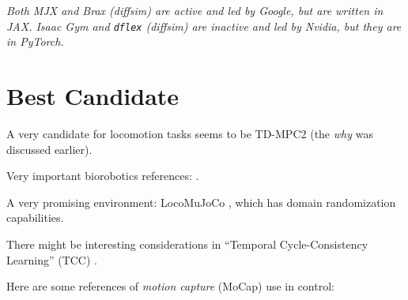 \documentclass[12pt,a4paper]{article}
\begin{document}
\emph{Both MJX and Brax (diffsim) are active and led by Google, but are written in JAX.
Isaac Gym and \texttt{dflex} (diffsim) are inactive and led by Nvidia, but they are in PyTorch.}

\section{Best Candidate}
\label{s:best}

A very candidate for locomotion tasks seems to be TD-MPC2 \cite{Hansen2024-ld}
(the \emph{why} was discussed earlier).

Very important biorobotics references:
\cite{Hamner2010-lf, Falisse2019-wf, Falisse2019-ge, Song2020-ta, Werling2023-mg}.

A very promising environment: LocoMuJoCo \cite{Al-Hafez2023-dn},
which has domain randomization capabilities.

There might be interesting considerations in
``Temporal Cycle-Consistency Learning'' (TCC) \cite{Dwibedi2019-jv}.

Here are some references of \emph{motion capture} (MoCap) use in control:
\cite{Merel2017-lo, Merel2019-rn, Merel2020-ea, La_Barbera2021-kq, Bohez2022-jt,
Liu2022-lw, Winkler2022-nr, Sun2023-bl, Radosavovic2024-xl}


\end{document}
